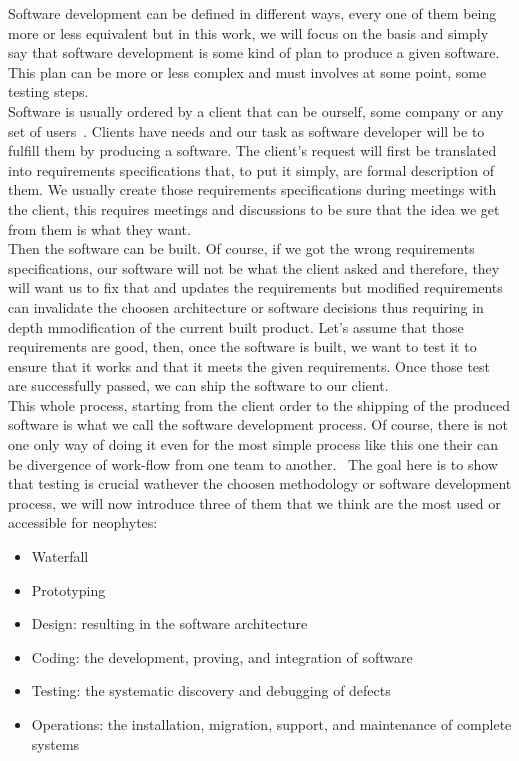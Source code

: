 \documentclass[12pt]{article}
\theoremstyle{definition}
\theoremstyle{definition}
\theoremstyle{remark}
\begin{document}
Software development can be defined in different ways, every one of them being more or less equivalent but in this work, we will focus on the basis and simply say that software development is some kind of plan to produce a given software. This plan can be more or less complex and must involves at some point, some testing steps.\\

Software is usually ordered by a client that can be ourself, some company or any set of users~\cite{SoftwareDevelopment:2016}. Clients have needs and our task as software developer will be to fulfill them by producing a software. The client's request will first be translated into requirements specifications that, to put it simply, are formal description of them. We usually create those requirements specifications during meetings with the client, this requires meetings and discussions to be sure that the idea we get from them is what they want.\\

Then the software can be built. Of course, if we got the wrong requirements specifications, our software will not be what the client asked and therefore, they will want us to fix that and updates the requirements but modified requirements can invalidate the choosen architecture or software decisions thus requiring in depth mmodification of the current built product. Let's assume that those requirements are good, then, once the software is built, we want to test it to ensure that it works and that it meets the given requirements. Once those test are successfully passed, we can ship the software to our client.\\

This whole process, starting from the client order to the shipping of the produced software is what we call the software development process. Of course, there is not one only way of doing it even for the most simple process like this one their can be divergence of work-flow from one team to another.~\cite{IIS2:IIS202348} The goal here is to show that testing is crucial wathever the choosen methodology or software development process, we will now introduce three of them that we think are the most used or accessible for neophytes:

\begin{itemize}
\item Waterfall
\item Prototyping
\item Design: resulting in the software architecture
\item Coding: the development, proving, and integration of software
\item Testing: the systematic discovery and debugging of defects
\item Operations: the installation, migration, support, and maintenance of complete systems
\end{itemize}
\end{document}
